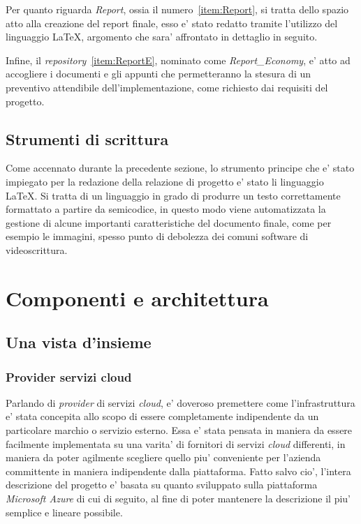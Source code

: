 \documentclass[a4paper]{report}
\begin{document}
		Per quanto riguarda \emph{Report}, ossia il numero~\ref{item:Report}, si tratta dello spazio atto alla creazione
		del report finale, esso e' stato redatto tramite l'utilizzo del linguaggio \LaTeX{}, argomento che sara'
		affrontato in dettaglio in seguito.

		Infine, il \emph{repository}~\ref{item:ReportE}, nominato come \emph{Report\_Economy}, e' atto ad accogliere i
		documenti e gli appunti che permetteranno la stesura di un preventivo attendibile dell'implementazione, come
		richiesto dai requisiti del progetto.
	\section{Strumenti di scrittura}\label{strumenti_di_scrittura}
		Come accennato durante la precedente sezione, lo strumento principe che e' stato impiegato per la redazione
		della relazione di progetto e' stato li linguaggio \LaTeX{}. Si tratta di un linguaggio in grado di produrre un
		testo correttamente formattato a partire da semicodice, in questo modo viene automatizzata la gestione di alcune
		importanti caratteristiche del documento finale, come per esempio le immagini, spesso punto di debolezza dei
		comuni software di videoscrittura.

\chapter{Componenti e architettura}\label{componenti_e_architettura}
	\section{Una vista d'insieme}\label{una_vista_dinsieme}
		\subsection{Provider servizi cloud}\label{provider_servizi_cloud}
			Parlando di \emph{provider} di servizi \emph{cloud}, e' doveroso premettere come l'infrastruttura e' stata
			concepita allo scopo di essere completamente indipendente da un particolare marchio o servizio esterno. Essa
			e' stata pensata in maniera da essere facilmente implementata su una varita' di fornitori di servizi
			\emph{cloud} differenti, in maniera da poter agilmente scegliere quello piu' conveniente per l'azienda
			committente in maniera indipendente dalla piattaforma. Fatto salvo cio', l'intera descrizione del progetto
			e' basata su quanto sviluppato sulla piattaforma \emph{Microsoft Azure} di cui di seguito, al fine di poter
			mantenere la descrizione il piu' semplice e lineare possibile.
\end{document}
